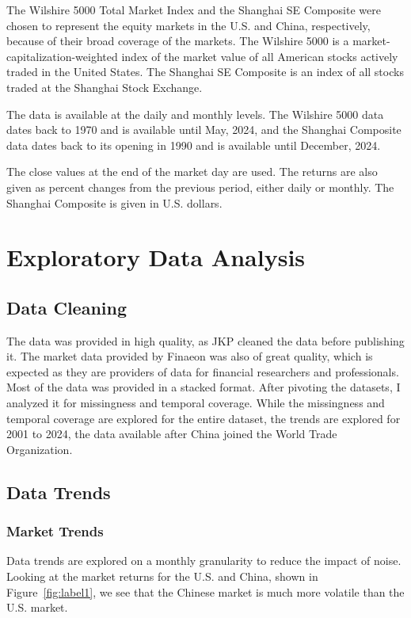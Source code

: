 The Wilshire 5000 Total Market Index and the Shanghai SE Composite were chosen to represent the equity markets in the U.S. and China, respectively, because of their broad coverage of the markets. The Wilshire 5000 is a market-capitalization-weighted index of the market value of all American stocks actively traded in the United States. The Shanghai SE Composite is an index of all stocks traded at the Shanghai Stock Exchange.

The data is available at the daily and monthly levels. The Wilshire 5000 data dates back to 1970 and is available until May, 2024, and the Shanghai Composite data dates back to its opening in 1990 and is available until December, 2024. 

The close values at the end of the market day are used. The returns are also given as percent changes from the previous period, either daily or monthly. The Shanghai Composite is given in U.S. dollars.

\section{Exploratory Data Analysis}
\subsection{Data Cleaning}

The data was provided in high quality, as JKP cleaned the data before publishing it. The market data provided by Finaeon was also of great quality, which is expected as they are providers of data for financial researchers and professionals. Most of the data was provided in a stacked format. After pivoting the datasets, I analyzed it for missingness and temporal coverage. While the missingness and temporal coverage are explored for the entire dataset, the trends are explored for 2001 to 2024, the data available after China joined the World Trade Organization. 

\subsection{Data Trends}
\subsubsection{Market Trends}

Data trends are explored on a monthly granularity to reduce the impact of noise. Looking at the market returns for the U.S. and China, shown in Figure~\ref{fig:label1}, we see that the Chinese market is much more volatile than the U.S. market.

